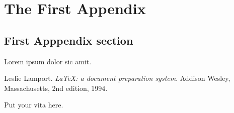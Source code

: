 \documentclass[endorse]{ukydissertation}
\begin{document}
\backmatter

\chapter{The First Appendix}
\label{cha:first-appendix}

\section{First Apppendix section}
\label{sec:first-appp-sect}
Lorem ipsum dolor sic amit.

\clearpage
{} 
% 
% 

\begin{thebibliography}{9}
  Leslie Lamport.
  \emph{\LaTeX: a document preparation system}.
  Addison Wesley, Massachusetts, 2nd edition, 1994.
\end{thebibliography}

\vita
Put your vita here.
\end{document}
